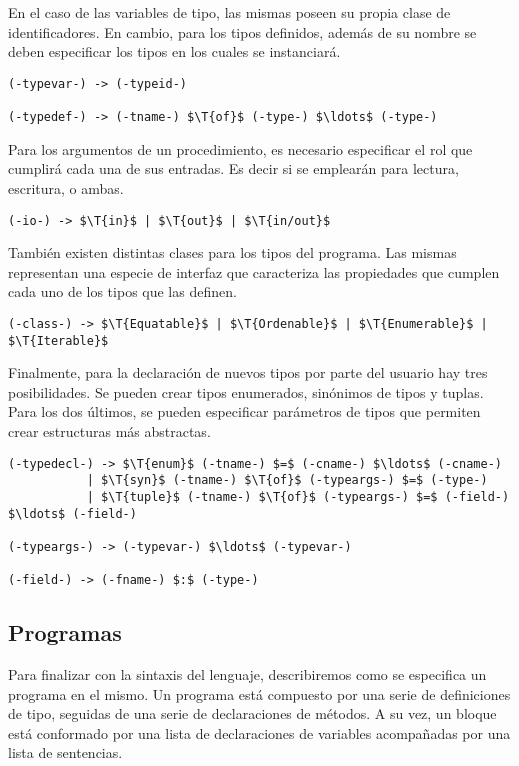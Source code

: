 \documentclass{article}
\begin{document}
En el caso de las variables de tipo, las mismas poseen su propia clase de identificadores.
En cambio, para los tipos definidos, además de su nombre se deben especificar los tipos en los cuales se instanciará.

\begin{lstlisting}[style = syntax]
(-typevar-) -> (-typeid-)

(-typedef-) -> (-tname-) $\T{of}$ (-type-) $\ldots$ (-type-)
\end{lstlisting}

Para los argumentos de un procedimiento, es necesario especificar el rol que cumplirá cada una de sus entradas.
Es decir si se emplearán para lectura, escritura, o ambas.

\begin{lstlisting}[style = syntax]
(-io-) -> $\T{in}$ | $\T{out}$ | $\T{in/out}$
\end{lstlisting}

También existen distintas clases para los tipos del programa.
Las mismas representan una especie de interfaz que caracteriza las propiedades que cumplen cada uno de los tipos que las definen.

\begin{lstlisting}[style = syntax]
(-class-) -> $\T{Equatable}$ | $\T{Ordenable}$ | $\T{Enumerable}$ | $\T{Iterable}$
\end{lstlisting}

Finalmente, para la declaración de nuevos tipos por parte del usuario hay tres posibilidades.
Se pueden crear tipos enumerados, sinónimos de tipos y tuplas.
Para los dos últimos, se pueden especificar parámetros de tipos que permiten crear estructuras más abstractas.

\begin{lstlisting}[style = syntax]
(-typedecl-) -> $\T{enum}$ (-tname-) $=$ (-cname-) $\ldots$ (-cname-)
           | $\T{syn}$ (-tname-) $\T{of}$ (-typeargs-) $=$ (-type-)
           | $\T{tuple}$ (-tname-) $\T{of}$ (-typeargs-) $=$ (-field-) $\ldots$ (-field-)

(-typeargs-) -> (-typevar-) $\ldots$ (-typevar-)

(-field-) -> (-fname-) $:$ (-type-)
\end{lstlisting}

\subsection{Programas}

Para finalizar con la sintaxis del lenguaje, describiremos como se especifica un programa en el mismo.
Un programa está compuesto por una serie de definiciones de tipo, seguidas de una serie de declaraciones de métodos.
A su vez, un bloque está conformado por una lista de declaraciones de variables acompañadas por una lista de sentencias.
\end{document}
